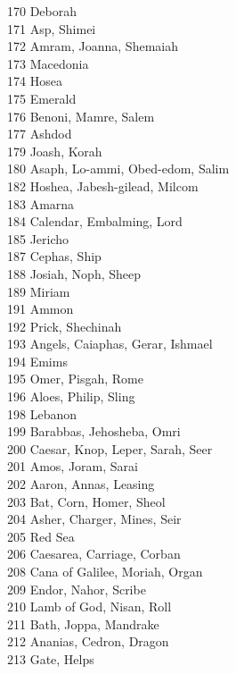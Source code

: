 170 \quad Deborah\\
171 \quad Asp, Shimei\\
172 \quad Amram, Joanna, Shemaiah\\
173 \quad Macedonia\\
174 \quad Hosea\\
175 \quad Emerald\\
176 \quad Benoni, Mamre, Salem\\
177 \quad Ashdod\\
179 \quad Joash, Korah\\
180 \quad Asaph, Lo-ammi, Obed-edom, Salim\\
182 \quad Hoshea, Jabesh-gilead, Milcom\\
183 \quad Amarna\\
184 \quad Calendar, Embalming, Lord\\
185 \quad Jericho\\
187 \quad Cephas, Ship\\
188 \quad Josiah, Noph, Sheep\\
189 \quad Miriam\\
191 \quad Ammon\\
192 \quad Prick, Shechinah\\
193 \quad Angels, Caiaphas, Gerar, Ishmael\\
194 \quad Emims\\
195 \quad Omer, Pisgah, Rome\\
196 \quad Aloes, Philip, Sling\\
198 \quad Lebanon\\
199 \quad Barabbas, Jehosheba, Omri\\
200 \quad Caesar, Knop, Leper, Sarah, Seer\\
201 \quad Amos, Joram, Sarai\\
202 \quad Aaron, Annas, Leasing\\
203 \quad Bat, Corn, Homer, Sheol\\
204 \quad Asher, Charger, Mines, Seir\\
205 \quad Red Sea\\
206 \quad Caesarea, Carriage, Corban\\
208 \quad Cana of Galilee, Moriah, Organ\\
209 \quad Endor, Nahor, Scribe\\
210 \quad Lamb of God, Nisan, Roll\\
211 \quad Bath, Joppa, Mandrake\\
212 \quad Ananias, Cedron, Dragon\\
213 \quad Gate, Helps\\
